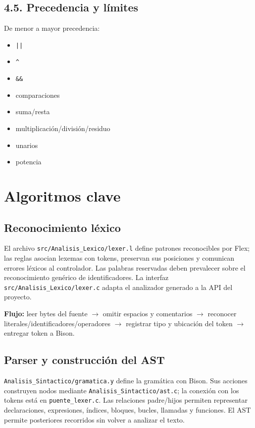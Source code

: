 \subsection{4.5. Precedencia y
límites}\label{45-precedencia-y-luxedmites}

De menor a mayor precedencia:
\begin{itemize}
    \item \texttt{||}
    \item \texttt{\textasciicircum}
    \item \texttt{\&\&}
    \item comparaciones
    \item suma/resta
    \item multiplicación/división/residuo
    \item unarios
    \item potencia
\end{itemize}

\section{Algoritmos clave}\label{5-algoritmos-clave--apartado-83}

\subsection{Reconocimiento
léxico}\label{51-reconocimiento-luxe9xico}

El archivo \texttt{src/Analisis_Lexico/lexer.l} define patrones
reconocibles por Flex; las reglas asocian lexemas con tokens, preservan
sus posiciones y comunican errores léxicos al controlador. Las palabras
reservadas deben prevalecer sobre el reconocimiento genérico de
identificadores. La interfaz \texttt{src/Analisis_Lexico/lexer.c}
adapta el analizador generado a la API del proyecto.

\textbf{Flujo:} leer bytes del fuente $\rightarrow$ omitir espacios y comentarios $\rightarrow$
reconocer literales/identificadores/operadores $\rightarrow$ registrar tipo y
ubicación del token $\rightarrow$ entregar token a Bison. 

\subsection{Parser y construcción del
AST}\label{52-parser-y-construcciuxf3n-del-ast}

\texttt{Analisis\_Sintactico/gramatica.y} define la
gramática con Bison. Sus acciones construyen nodos mediante
\texttt{Analisis\_Sintactico/ast.c}; la conexión con
los tokens está en \texttt{puente\_lexer.c}. Las
relaciones padre/hijos permiten representar declaraciones, expresiones,
índices, bloques, bucles, llamadas y funciones. El AST permite
posteriores recorridos sin volver a analizar el texto.

